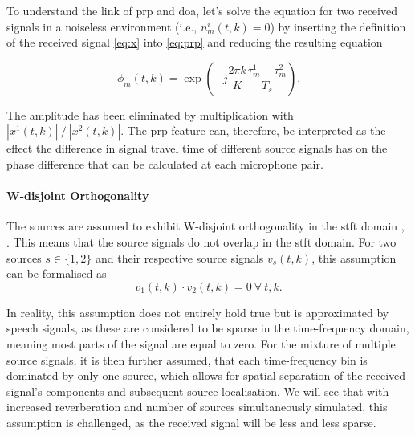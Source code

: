 To understand the link of \gls{prp} and \gls{doa}, let's solve the equation for two received signals in a noiseless environment (i.e., $n^i_{m}(t,k)=0$) by inserting the definition of the received signal \eqref{eq:x} into \eqref{eq:prp} and reducing the resulting equation

\begin{equation}
    \phi_{m}(t,k)=\exp{\left ( -j\frac{2\pi k}{K}\frac{\tau_{m}^1-\tau_{m}^2}{T_s}\right )}.
\end{equation}

The amplitude has been eliminated by multiplication with $|x^1(t,k)|\ /\ |x^2(t,k)|$. The \gls{prp} feature can, therefore, be interpreted as the effect the difference in signal travel time of different source signals has on the phase difference that can be calculated at each microphone pair.

\paragraph{W-disjoint Orthogonality}
The sources are assumed to exhibit W-disjoint orthogonality in the \gls{stft} domain \cite[p.~393]{Schwartz2014}, \cite{Rickard2006}. This means that the source signals do not overlap in the \gls{stft} domain. For two sources $s\in\{1,2\}$ and their respective source signals $v_s(t,k)$, this assumption can be formalised as
\begin{equation}
    v_1(t,k)\cdot v_2(t,k)=0~\forall~t,k.
\end{equation}

In reality, this assumption does not entirely hold true but is approximated by speech signals, as these are considered to be sparse in the time-frequency domain, meaning most parts of the signal are equal to zero. For the mixture of multiple source signals, it is then further assumed, that each time-frequency bin is dominated by only one source, which allows for spatial separation of the received signal's components and subsequent source localisation. We will see that with increased reverberation and number of sources simultaneously simulated, this assumption is challenged, as the received signal will be less and less sparse.